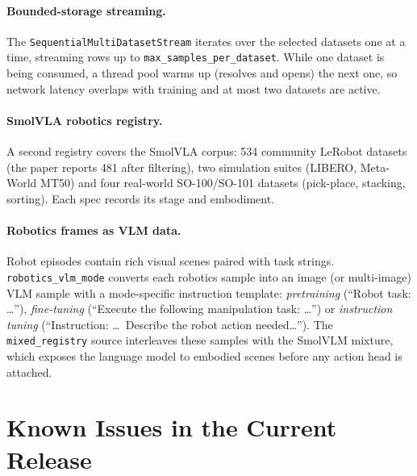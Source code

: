 \documentclass[11pt]{article}
\begin{document}
\paragraph{Bounded-storage streaming.} The \texttt{SequentialMultiDatasetStream} iterates over
the selected datasets one at a time, streaming rows up to \texttt{max\_samples\_per\_dataset}.
While one dataset is being consumed, a thread pool warms up (resolves and opens) the next
one, so network latency overlaps with training and at most two datasets are active.

\paragraph{SmolVLA robotics registry.} A second registry covers the SmolVLA corpus: 534
community LeRobot datasets (the paper reports 481 after filtering), two simulation suites
(LIBERO, Meta-World MT50) and four real-world SO-100/SO-101 datasets (pick-place, stacking,
sorting). Each spec records its stage and embodiment.

\paragraph{Robotics frames as VLM data.} Robot episodes contain rich visual scenes paired with
task strings. \texttt{robotics\_vlm\_mode} converts each robotics sample into an image (or
multi-image) VLM sample with a mode-specific instruction template: \emph{pretraining}
(``Robot task: \ldots''), \emph{fine-tuning} (``Execute the following manipulation task:
\ldots'') or \emph{instruction tuning} (``Instruction: \ldots\ Describe the robot action
needed\ldots''). The \texttt{mixed\_registry} source interleaves these samples with the
SmolVLM mixture, which exposes the language model to embodied scenes before any action
head is attached.

\section{Known Issues in the Current Release}
\label{sec:issues}
\end{document}
